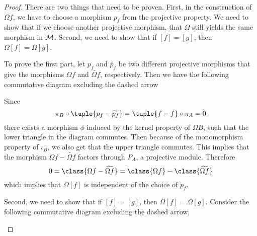 \begin{proof}
    There are two things that need to be proven. First, in the construction of \( \Omega f \), we have to choose a morphism \( p_f \) from the projective property. We need to show that if we choose another projective morphism, that \( \Omega \) still yields the same morphism in \( {\mathcal{M}} \). Second, we need to show that if \( [f] = [g] \), then \( \Omega [f] = \Omega [g] \).

    To prove the first part, let \( p_f \) and \( \widetilde{p_f} \) be two different projective morphisms that give the morphisms \( \Omega f \) and \( \widetilde{\Omega f} \), respectively. Then we have the following commutative diagram excluding the dashed arrow
    \begin{center}
    \end{center}

    Since
    \[
        \pi_B \circ \tuple{p_f - \widetilde{p_f}} = \tuple{f - f} \circ \pi_A = 0
    \]
    there exists a morphism \( \phi \) induced by the kernel property of \( \Omega B \), such that the lower triangle in the diagram commutes. Then because of the monomorphism property of \( \iota_B \), we also get that the upper triangle commutes. This implies that the morphism \( \Omega f - \widetilde{\Omega f} \) factors through \( P_A \), a projective module. Therefore
    \[
        0 = \class{\Omega f - \widetilde{\Omega f}} = \class{\Omega f} - \class{\widetilde{\Omega f}}
    \]
    which implies that \( \Omega [f] \) is independent of the choice of \( p_f \).

    Second, we need to show that if \( [f] = [g] \), then \( \Omega [f] = \Omega [g] \). Consider the following commutative diagram excluding the dashed arrow,
    \begin{center}
\end{center}
\end{proof}
